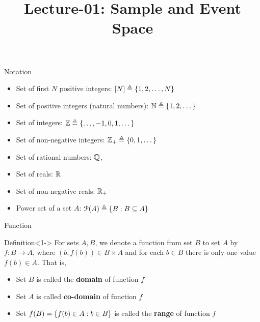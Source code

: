 \documentclass[12pt,aspectratio=169]{beamer}
\title{Lecture-01: Sample and Event Space}
\date{}
\begin{document}
\pagestyle{empty}
\maketitle

\begin{frame}{Notation}

    \begin{itemize}
        \item<1-> Set of first $N$ positive integers: $[N] \triangleq \left\{1, 2, \dots, N\right\}$
        \item<2-> Set of positive integers (natural numbers): $\mathbb{N} \triangleq \left\{1, 2, \dots\right\}$
        \item<3-> Set of integers: $\mathbb{Z} \triangleq \left\{\dots, -1, 0, 1, \dots\right\}$
        \item<4-> Set of non-negative integers: $\mathbb{Z}_+ \triangleq \left\{0, 1, \dots\right\}$
        \item<5-> Set of rational numbers: $\mathbb{Q}$, %
        \item<6-> Set of reals: $\mathbb{R}$
        \item<7-> Set of non-negative reals: $\mathbb{R}_+$
        \item<8-> Power set of a set $A$: $\mathcal{P}(A) \triangleq \left\{B: B \subseteq A\right\}$
    \end{itemize}
\end{frame}

\begin{frame}{Function}
    \begin{block}{Definition}<1->
        For sets $A, B$, we denote a function from set $B$ to set $A$ by $f: B \to A$, where $(b, f(b)) \in B \times A$ and for each $b \in B$ there is only one value $f(b) \in A$. That is, 
    \end{block}
    \begin{itemize}
        \item<2-> Set $B$ is called the \textbf{domain} of function $f$
        \item<3-> Set $A$ is called \textbf{co-domain} of function $f$
        \item<4-> Set $f(B) =\left\{f(b) \in A: b \in B\right\}$ is called the \textbf{range} of function $f$
    \end{itemize}
\end{frame}
\end{document}
